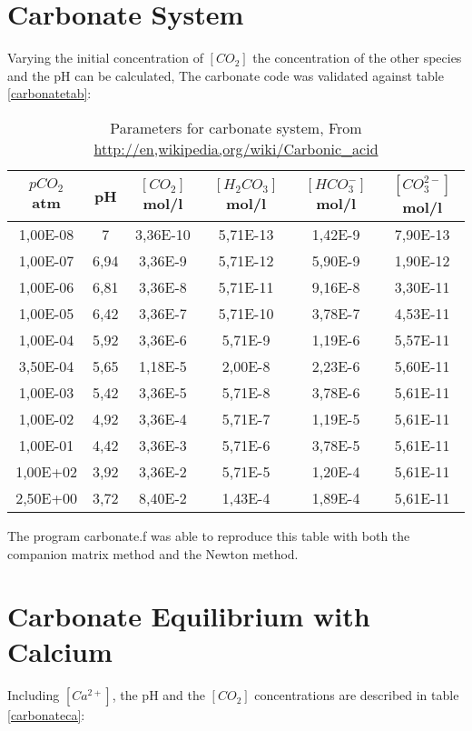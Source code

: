\documentclass[11pt,a4paper,twoside]{report}
\begin{document}
\section{Carbonate System}
Varying the initial concentration of $[CO_{2}]$ the concentration of the other species and the pH can be calculated, The carbonate code was validated against table \eqref{carbonatetab}:

\begin{table}[h]
\setlength{\tabcolsep}{15pt}
\begin{center}
\begin{tabular}{| c| c | c | c | c| c | }
\hline
$pCO_{2}$ atm &  pH &    $[CO_{2}]$ mol/l  & $[H_{2}CO_{3}]$ mol/l &  $[HCO_{3}^{-}]$mol/l & $[CO_{3}^{2-}]$mol/l \\
\hline
1,00E-08 & 7 & 3,36E-10 & 5,71E-13 & 1,42E-9 & 7,90E-13 \\
\hline
1,00E-07 & 6,94 & 3,36E-9 & 5,71E-12 & 5,90E-9 & 1,90E-12 \\
\hline
1,00E-06 & 6,81 & 3,36E-8 & 5,71E-11 & 9,16E-8 & 3,30E-11 \\
\hline
1,00E-05 & 6,42 & 3,36E-7 & 5,71E-10 & 3,78E-7 & 4,53E-11 \\
\hline
1,00E-04 & 5,92 & 3,36E-6 & 5,71E-9 &1,19E-6& 5,57E-11 \\
\hline
3,50E-04 & 5,65 & 1,18E-5 &2,00E-8 &2,23E-6& 5,60E-11 \\
\hline
1,00E-03 & 5,42&  3,36E-5& 5,71E-8 &3,78E-6 &5,61E-11 \\
\hline
1,00E-02 & 4,92 & 3,36E-4 &5,71E-7& 1,19E-5& 5,61E-11 \\
\hline
1,00E-01 & 4,42 & 3,36E-3 &5,71E-6& 3,78E-5 &5,61E-11 \\
\hline
1,00E+02 & 3,92 & 3,36E-2& 5,71E-5 &1,20E-4 &5,61E-11 \\
\hline
2,50E+00 & 3,72 & 8,40E-2& 1,43E-4 &1,89E-4& 5,61E-11 \\
\hline
\end{tabular}
\caption{Parameters for carbonate system, From \url{http://en,wikipedia,org/wiki/Carbonic_acid}}
\label{carbonatetab}
\end{center}
\end{table}

The program carbonate.f was able to reproduce this table with both the companion matrix method and the Newton method.

\section{Carbonate Equilibrium with Calcium}
Including $[Ca^{2+}]$, the pH and the $[CO_{2}]$ concentrations are described in table \eqref{carbonateca}:
\end{document}
